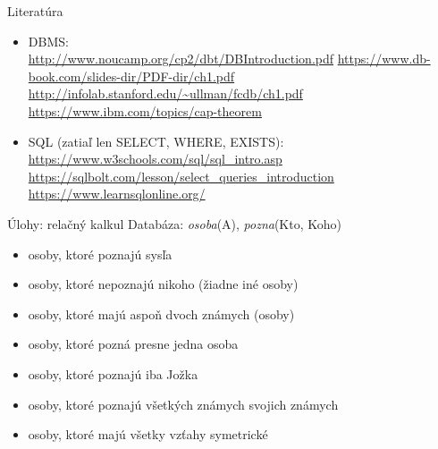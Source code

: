\documentclass[12pt]{beamer}
\begin{document}
\begin{frame}{Literatúra}
\begin{itemize}
\item DBMS:\\
{\scriptsize\url{http://www.noucamp.org/cp2/dbt/DBIntroduction.pdf}}
{\scriptsize\url{https://www.db-book.com/slides-dir/PDF-dir/ch1.pdf}}
{\scriptsize\url{http://infolab.stanford.edu/~ullman/fcdb/ch1.pdf}}
{\scriptsize\url{https://www.ibm.com/topics/cap-theorem}}

\item SQL (zatiaľ len SELECT, WHERE, EXISTS):\\
{\scriptsize\url{https://www.w3schools.com/sql/sql_intro.asp}}\\
{\scriptsize\url{https://sqlbolt.com/lesson/select_queries_introduction}}\\
{\scriptsize\url{https://www.learnsqlonline.org/}}\\
\end{itemize}
\end{frame}


\begin{frame}{Úlohy: relačný kalkul}
Databáza: \emph{osoba}(A), \emph{pozna}(Kto, Koho)
\begin{itemize}
    \item osoby, ktoré poznajú sysľa
    \item osoby, ktoré nepoznajú nikoho (žiadne iné osoby)
    \item osoby, ktoré majú aspoň dvoch známych (osoby)
    \item osoby, ktoré pozná presne jedna osoba
    \item osoby, ktoré poznajú iba Jožka
    \item osoby, ktoré poznajú všetkých známych svojich známych
    \item osoby, ktoré majú všetky vzťahy symetrické
\end{itemize}
\end{frame}
\end{document}

